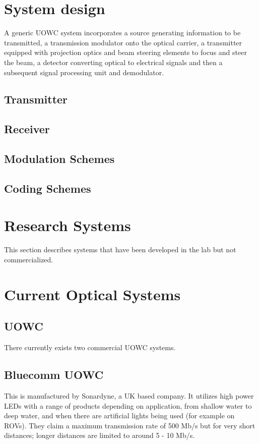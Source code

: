 \documentclass{article}
\begin{document}
\section{System design}
A generic \ac{UOWC} system incorporates a source generating information to be transmitted, a transmission modulator onto the optical carrier, a transmitter equipped with projection optics and beam steering elements to focus and steer the beam, a detector converting optical to electrical signals and then a subsequent signal processing unit and demodulator.

\subsection{Transmitter}

\subsection{Receiver}

\subsection{Modulation Schemes}

\subsection{Coding Schemes}

\section{Research Systems}
This section describes systems that have been developed in the lab but not commercialized.

\section{Current Optical Systems}
\subsection{\ac{UOWC}}
There currently exists two commercial \ac{UOWC} systems.

\subsection{Bluecomm \ac{UOWC}}
This is manufactured by Sonardyne, a UK based company. It utilizes high power \ac{LED}s with a range of products depending on application, from shallow water to deep water, and when there are artificial lights being used (for example on \ac{ROV}s). They claim a maximum transmission rate of 500 Mb/s but for very short distances; longer distances are limited to around 5 - 10 Mb/s.
\end{document}
